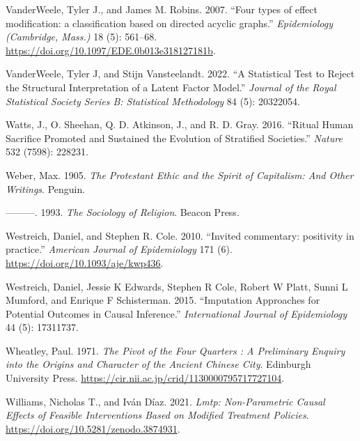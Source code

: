 \documentclass[
  singlecolumn]{report}
\newlength{\cslhangindent}
\newlength{\cslentryspacingunit} %
\newenvironment{CSLReferences}[2] %
 {%
  \setlength{\parindent}{0pt}
  \ifodd #1
  \let\oldpar\par
  \def\par{\hangindent=\cslhangindent\oldpar}
  \fi
  \setlength{\parskip}{#2\cslentryspacingunit}
 }%
 {}
\begin{document}
\begin{CSLReferences}{1}{0}
\leavevmode{}%
VanderWeele, Tyler J., and James M. Robins. 2007. {``Four types of
effect modification: a classification based on directed acyclic
graphs.''} \emph{Epidemiology (Cambridge, Mass.)} 18 (5): 561--68.
\url{https://doi.org/10.1097/EDE.0b013e318127181b}.

\leavevmode{}%
VanderWeele, Tyler J, and Stijn Vansteelandt. 2022. {``A Statistical
Test to Reject the Structural Interpretation of a Latent Factor
Model.''} \emph{Journal of the Royal Statistical Society Series B:
Statistical Methodology} 84 (5): 20322054.

\leavevmode{}%
Watts, J., O. Sheehan, Q. D. Atkinson, J., and R. D. Gray. 2016.
{``Ritual Human Sacrifice Promoted and Sustained the Evolution of
Stratified Societies.''} \emph{Nature} 532 (7598): 228231.

\leavevmode{}%
Weber, Max. 1905. \emph{The Protestant Ethic and the Spirit of
Capitalism: And Other Writings}. Penguin.

\leavevmode{}%
---------. 1993. \emph{The Sociology of Religion}. Beacon Press.

\leavevmode{}%
Westreich, Daniel, and Stephen R. Cole. 2010. {``Invited commentary:
positivity in practice.''} \emph{American Journal of Epidemiology} 171
(6). \url{https://doi.org/10.1093/aje/kwp436}.

\leavevmode{}%
Westreich, Daniel, Jessie K Edwards, Stephen R Cole, Robert W Platt,
Sunni L Mumford, and Enrique F Schisterman. 2015. {``Imputation
Approaches for Potential Outcomes in Causal Inference.''}
\emph{International Journal of Epidemiology} 44 (5): 17311737.

\leavevmode{}%
Wheatley, Paul. 1971. \emph{The Pivot of the Four Quarters : A
Preliminary Enquiry into the Origins and Character of the Ancient
Chinese City}. Edinburgh University Press.
\url{https://cir.nii.ac.jp/crid/1130000795717727104}.

\leavevmode{}%
Williams, Nicholas T., and Iván Díaz. 2021. \emph{Lmtp: Non-Parametric
Causal Effects of Feasible Interventions Based on Modified Treatment
Policies}. \url{https://doi.org/10.5281/zenodo.3874931}.

\end{CSLReferences}
\end{document}
